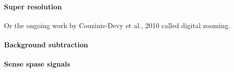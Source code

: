 \paragraph{Super resolution} \cite{Yang2010} \cite{Wright2008}  
Or the ongoing work by Couzinie-Devy et al., 2010 called digital zooming.

\paragraph{Background subtraction} \cite{}

\paragraph{Sense spase signals}\cite{Duarte2009}






